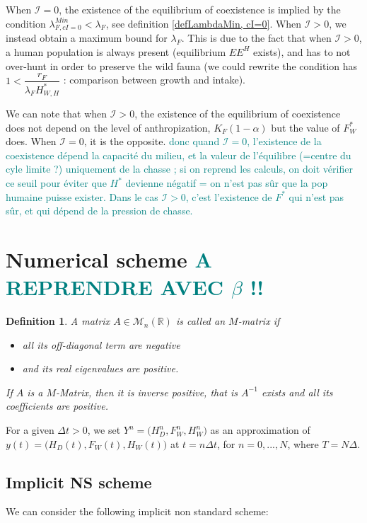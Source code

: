 \documentclass{article}
\newcommand{\lfw}{\lambda_{F}}
\newcommand{\lfw}{\lambda_{F}}
\newcommand{\cI}{\mathcal{I}}
\newcommand{\marc}[1]{\textcolor{teal}{#1}}
\newtheorem{definition}{Definition}
\begin{document}
When $\cI = 0$, the existence of the equilibrium of coexistence is implied by the condition $\lambda_{F, cI = 0}^{Min} < \lfw$, see definition \ref{defLambdaMin, cI=0}. When $\cI > 0$, we instead obtain a maximum bound for $\lfw$. This is due to the fact that when $\cI > 0$, a human population is always present (equilibrium $EE^{H}$ exists), and has to not over-hunt in order to preserve the wild fauna (we could rewrite the condition has $1 < \dfrac{r_F}{\lfw H^*_{W, H}}$ : comparison between growth and intake).


We can note that when $\cI > 0$, the existence of the equilibrium of coexistence does not depend on the level of anthropization, $K_F(1-\alpha)$ but the value of $F^*_W$ does. When $\cI = 0$, it is the opposite. 
\marc{donc quand $\cI =0$, l'existence de la coexistence dépend la capacité du milieu, et la valeur de l'équilibre (=centre du cyle limite ?) uniquement de la chasse ; si on reprend les calculs, on doit vérifier ce seuil pour éviter que $H^*$ devienne négatif = on n'est pas sûr que la pop humaine puisse exister. Dans le cas $\cI > 0$, c'est l'existence de $F^*$ qui n'est pas sûr, et qui dépend de la pression de chasse.}

\section{Numerical scheme \marc{A REPRENDRE AVEC $\beta$ !!}}
\begin{definition} A matrix $A \in \mathcal{M}_n (\mathbb{R})$ is called an $M$-matrix if\begin{itemize}
\item all its off-diagonal term are negative
\item and its real eigenvalues are positive.
\end{itemize}

If $A$ is a $M$-Matrix, then it is inverse positive, that is $A^{-1}$ exists and all its coefficients are positive.


\end{definition}


For a given $\Delta t>0$, we set $Y^n=\Big(H_D^n,F_W^n,H_W^n \Big)$ as an approximation of $y(t)=\Big(H_D(t),F_W(t),H_W(t)\Big)$ at $t=n\Delta t$, for $n=0,...,N$, where $T=N\Delta$.


\subsection{Implicit NS scheme}
We can consider the following implicit non standard scheme:
\end{document}
